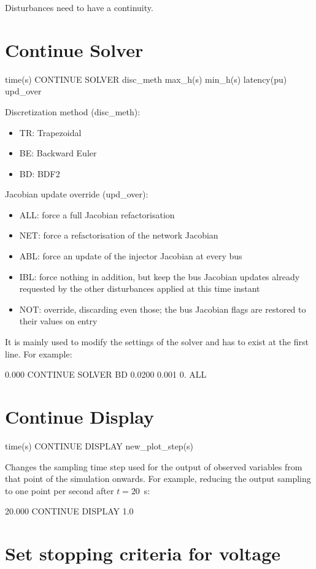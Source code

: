 Disturbances need to have a continuity.


\section{Continue Solver}\label{sec-continue-solver}

time(s) CONTINUE SOLVER disc\_meth max\_h(s)
	min\_h(s) latency(pu) upd\_over  
	
Discretization method (disc\_meth): 
\begin{itemize}
	\item TR: Trapezoidal 
	\item BE: Backward Euler 
	\item BD: BDF2 
\end{itemize}
Jacobian update override (upd\_over):
\begin{itemize}
	\item ALL: force a full Jacobian refactorisation
	\item NET: force a refactorisation of the network Jacobian
	\item ABL: force an update of the injector Jacobian at every bus
	\item IBL: force nothing in addition, but keep the bus Jacobian updates already requested by the other disturbances applied at this time instant
	\item NOT: override, discarding even those; the bus Jacobian flags are restored to their values on entry
\end{itemize}
It is mainly used to modify the settings of the solver and has to
exist at the first line. For example:

0.000 CONTINUE SOLVER BD 0.0200 0.001 0. ALL


\section{Continue Display}

time(s) CONTINUE DISPLAY new\_plot\_step(s)

Changes the sampling time step used for the output of observed
variables from that point of the simulation onwards. For example,
reducing the output sampling to one point per second after $t=20$~s:

20.000 CONTINUE DISPLAY 1.0


\section{Set stopping criteria for voltage}


